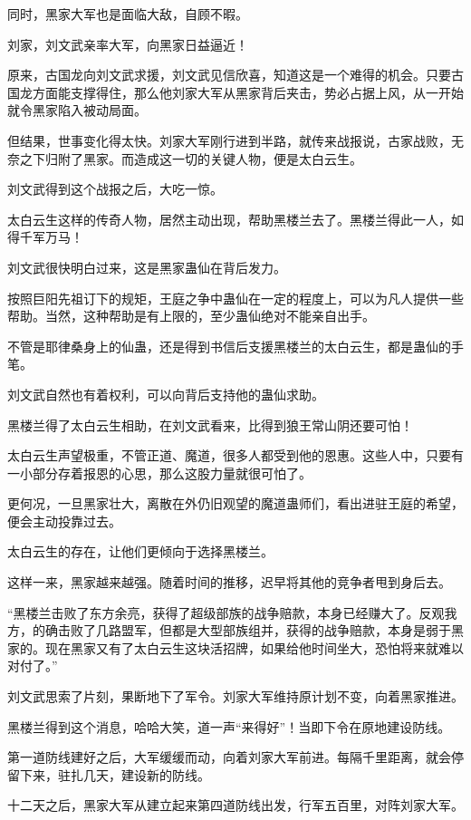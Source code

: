 \begin{this_body}
同时，黑家大军也是面临大敌，自顾不暇。

刘家，刘文武亲率大军，向黑家日益逼近！

原来，古国龙向刘文武求援，刘文武见信欣喜，知道这是一个难得的机会。只要古国龙方面能支撑得住，那么他刘家大军从黑家背后夹击，势必占据上风，从一开始就令黑家陷入被动局面。

但结果，世事变化得太快。刘家大军刚行进到半路，就传来战报说，古家战败，无奈之下归附了黑家。而造成这一切的关键人物，便是太白云生。

刘文武得到这个战报之后，大吃一惊。

太白云生这样的传奇人物，居然主动出现，帮助黑楼兰去了。黑楼兰得此一人，如得千军万马！

刘文武很快明白过来，这是黑家蛊仙在背后发力。

按照巨阳先祖订下的规矩，王庭之争中蛊仙在一定的程度上，可以为凡人提供一些帮助。当然，这种帮助是有上限的，至少蛊仙绝对不能亲自出手。

不管是耶律桑身上的仙蛊，还是得到书信后支援黑楼兰的太白云生，都是蛊仙的手笔。

刘文武自然也有着权利，可以向背后支持他的蛊仙求助。

黑楼兰得了太白云生相助，在刘文武看来，比得到狼王常山阴还要可怕！

太白云生声望极重，不管正道、魔道，很多人都受到他的恩惠。这些人中，只要有一小部分存着报恩的心思，那么这股力量就很可怕了。

更何况，一旦黑家壮大，离散在外仍旧观望的魔道蛊师们，看出进驻王庭的希望，便会主动投靠过去。

太白云生的存在，让他们更倾向于选择黑楼兰。

这样一来，黑家越来越强。随着时间的推移，迟早将其他的竞争者甩到身后去。

“黑楼兰击败了东方余亮，获得了超级部族的战争赔款，本身已经赚大了。反观我方，的确击败了几路盟军，但都是大型部族组并，获得的战争赔款，本身是弱于黑家的。现在黑家又有了太白云生这块活招牌，如果给他时间坐大，恐怕将来就难以对付了。”

刘文武思索了片刻，果断地下了军令。刘家大军维持原计划不变，向着黑家推进。

黑楼兰得到这个消息，哈哈大笑，道一声“来得好”！当即下令在原地建设防线。

第一道防线建好之后，大军缓缓而动，向着刘家大军前进。每隔千里距离，就会停留下来，驻扎几天，建设新的防线。

十二天之后，黑家大军从建立起来第四道防线出发，行军五百里，对阵刘家大军。


\end{this_body}
